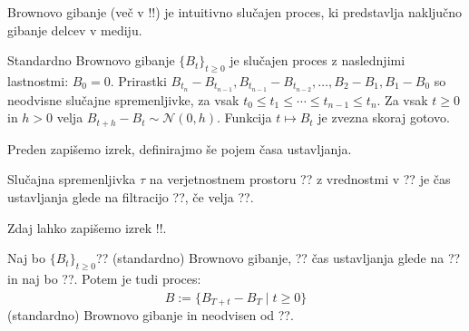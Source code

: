 \documentclass[11pt]{article}
\begin{document}
Brownovo gibanje (več v !!) je intuitivno slučajen proces, %
ki predstavlja naključno gibanje delcev v mediju.
    

    Standardno Brownovo gibanje $\{B_t\}_{t \geq 0}$ je slučajen proces z naslednjimi lastnostmi: 
        $B_0 = 0$.
        Prirastki $B_{t_n} - B_{t_{n-1}}, B_{t_{n-1}} - B_{t_{n-2}}, \ldots, B_2 - B_1, B_1 - B_0$ so neodvisne slučajne spremenljivke, za vsak $t_0 \leq t_1 \leq \cdots \leq t_{n-1} \leq t_n$.
        Za vsak $t \geq 0$ in $h > 0$ velja $B_{t+h} - B_t \sim \mathcal{N}(0, h)$.
        Funkcija $t \mapsto B_t$ je zvezna skoraj gotovo.
    
    Preden zapišemo izrek, definirajmo še pojem časa ustavljanja.
    
    Slučajna spremenljivka $\tau$ na verjetnostnem prostoru ?? z vrednostmi v ??
    je čas ustavljanja glede na filtracijo ??, če velja ??.
    
    Zdaj lahko zapišemo izrek !!. %
    
    Naj bo $\{B_t\}_{t \geq 0}$?? (standardno) Brownovo gibanje, ?? čas ustavljanja glede na 
    ?? in naj bo ??. 
    Potem je tudi proces:
    \[
    \hat{B} := \{B_{T+t} - B_T \mid t \geq 0\}
    \]
    (standardno) Brownovo gibanje in neodvisen od ??.
    
\end{document}
